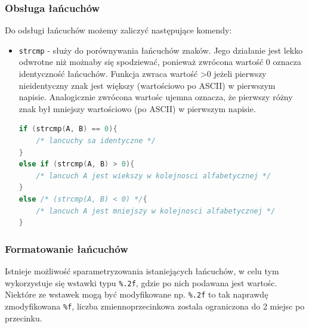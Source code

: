 \documentclass[a4paper,12pt,oneside]{book}
\begin{document}
				\subsubsection{Obsługa łańcuchów}
					Do odsługi łańcuchów możemy zaliczyć następujące komendy:
					\begin{itemize}
						\item \verb*|strcmp| - służy do porównywania łańcuchów znaków. Jego działanie jest lekko odwrotne niż możnaby się spodziewać, ponieważ zwrócona wartość 0 oznacza identyczność łańcuchów. Funkcja zwraca wartość >0 jeżeli pierwszy nieidentyczny znak jest większy (wartościowo po ASCII) w pierwszym napisie. Analogicznie zwrócona wartośc ujemna oznacza, że pierwszy różny znak był mniejszy wartościowo (po ASCII) w pierwszym napisie.
						\begin{lstlisting}[language=C]
if (strcmp(A, B) == 0){
    /* lancuchy sa identyczne */
}
else if (strcmp(A, B) > 0){
    /* lancuch A jest wiekszy w kolejnosci alfabetycznej */
}
else /* (strcmp(A, B) < 0) */{
    /* lancuch A jest mniejszy w kolejnosci alfabetycznej */
}
						\end{lstlisting}
					\end{itemize}
				
				\subsubsection{Formatowanie łańcuchów}
					Istnieje możliwość sparametryzowania istaniejących łańcuchów, w celu tym wykorzystuje się wstawki typu \verb*|%.2f|, gdzie po nich podawana jest wartośc. Niektóre ze wstawek mogą być modyfikowane np. \verb*|%.2f| to tak naprawdę zmodyfikowana \verb*|%f|, liczba zmiennoprzecinkowa zostala ograniczona do 2 miejsc po przecinku.\\
					
\end{document}
